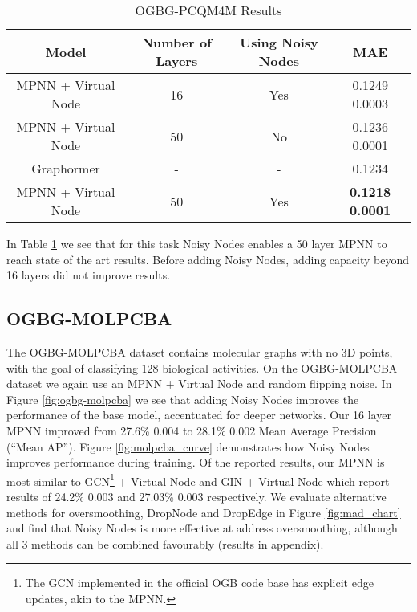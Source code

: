 \documentclass{article} \usepackage{iclr2022_conference,times}
\begin{document}
\begin{table}[]
    \centering
    \caption{OGBG-PCQM4M Results}
    \begin{tabular}{cccc}
    \toprule
         Model & Number of Layers & Using Noisy Nodes & MAE  \\
     \midrule
         MPNN + Virtual Node & 16 & Yes & 0.1249  0.0003 \\
         MPNN + Virtual Node & 50 & No & 0.1236  0.0001 \\
         Graphormer \citep{Ying2021DoTR} & - & - & 0.1234 \\
         MPNN + Virtual Node & 50 & Yes & 	\textbf{0.1218  0.0001} \\
     \bottomrule
    \end{tabular}
    
    \label{tab:pcqm4m}
\end{table}

In Table \ref{tab:pcqm4m} we see that for this task Noisy Nodes enables a 50 layer MPNN to reach state of the art results. Before adding Noisy Nodes, adding capacity beyond 16 layers did not improve results.

\subsection{OGBG-MOLPCBA}

The OGBG-MOLPCBA dataset contains molecular graphs with no 3D points, with the goal of classifying 128 biological activities. On the OGBG-MOLPCBA dataset we again use an MPNN + Virtual Node and random flipping noise. In Figure \ref{fig:ogbg-molpcba} we see that adding Noisy Nodes improves the performance of the base model, accentuated for deeper networks. Our 16 layer MPNN improved from 27.6\%  0.004 to 28.1\%  0.002 Mean Average Precision (``Mean AP''). Figure \ref{fig:molpcba_curve} demonstrates how Noisy Nodes improves performance during training. Of the reported results, our MPNN is most similar to GCN\footnote{The GCN implemented in the official OGB code base has explicit edge updates, akin to the MPNN.} + Virtual Node and GIN + Virtual Node \citep{Xu2018Gin} which report results of 24.2\%  0.003 and 27.03\%  0.003 respectively. We evaluate alternative methods for oversmoothing, DropNode  and DropEdge in Figure \ref{fig:mad_chart} and find that Noisy Nodes is more effective at address oversmoothing, although all 3 methods can be combined favourably (results in appendix).
\end{document}
